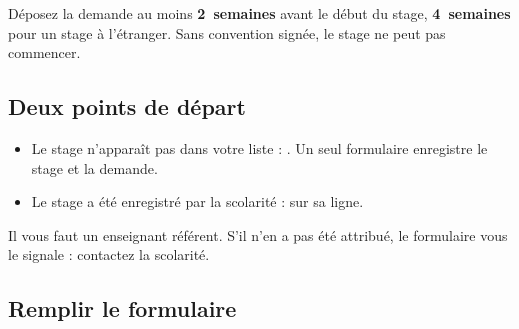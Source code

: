 \documentclass[11pt,a4paper]{article}
\begin{document}
\begin{attention}
Déposez la demande au moins \textbf{2~semaines} avant le début du stage,
\textbf{4~semaines} pour un stage à l'étranger. Sans convention signée, le stage
ne peut pas commencer.
\end{attention}

\subsection{Deux points de départ}

\begin{itemize}
  \item Le stage n'apparaît pas dans votre liste :
        . Un seul
        formulaire enregistre le stage et la demande.
  \item Le stage a été enregistré par la scolarité :  sur sa ligne.
\end{itemize}

Il vous faut un enseignant référent. S'il n'en a pas été attribué, le formulaire
vous le signale : contactez la scolarité.

\subsection{Remplir le formulaire}

\end{document}

